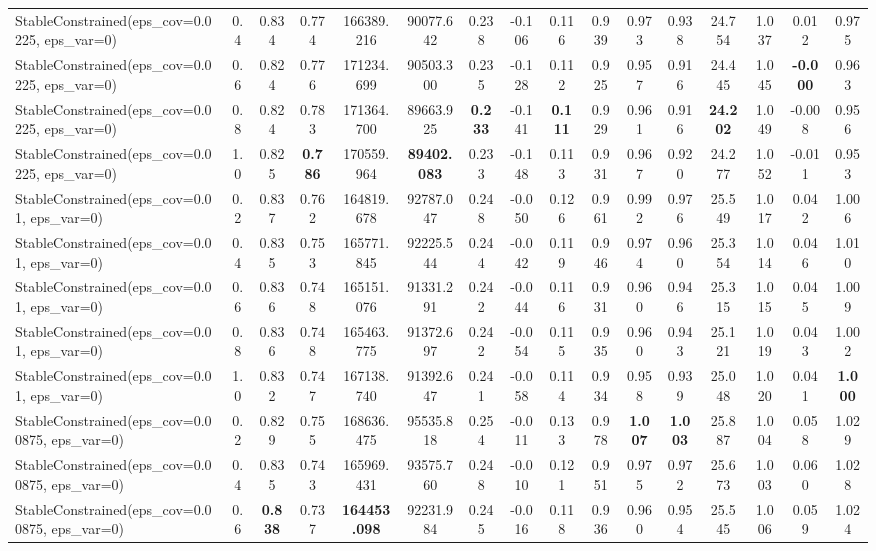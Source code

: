 \documentclass[11pt]{article}
\theoremstyle{plain}
\theoremstyle{definition}
\newcommand{\1}{\mathbf{1}}
\begin{document}
\begin{table}[h]
{\begin{tabular}{lccccccccccccccc}
StableConstrained(eps\_cov=0.0225, eps\_var=0) & 0.4 & 0.834 & 0.774 & 166389.216 & 90077.642 & 0.238 & -0.106 & 0.116 & 0.939 & 0.973 & 0.938 & 24.754 & 1.037 & 0.012 & 0.975 \\
StableConstrained(eps\_cov=0.0225, eps\_var=0) & 0.6 & 0.824 & 0.776 & 171234.699 & 90503.300 & 0.235 & -0.128 & 0.112 & 0.925 & 0.957 & 0.916 & 24.445 & 1.045 & \textbf{-0.000} & 0.963 \\
StableConstrained(eps\_cov=0.0225, eps\_var=0) & 0.8 & 0.824 & 0.783 & 171364.700 & 89663.925 & \textbf{0.233} & -0.141 & \textbf{0.111} & 0.929 & 0.961 & 0.916 & \textbf{24.202} & 1.049 & -0.008 & 0.956 \\
StableConstrained(eps\_cov=0.0225, eps\_var=0) & 1.0 & 0.825 & \textbf{0.786} & 170559.964 & \textbf{89402.083} & 0.233 & -0.148 & 0.113 & 0.931 & 0.967 & 0.920 & 24.277 & 1.052 & -0.011 & 0.953 \\
StableConstrained(eps\_cov=0.01, eps\_var=0) & 0.2 & 0.837 & 0.762 & 164819.678 & 92787.047 & 0.248 & -0.050 & 0.126 & 0.961 & 0.992 & 0.976 & 25.549 & 1.017 & 0.042 & 1.006 \\
StableConstrained(eps\_cov=0.01, eps\_var=0) & 0.4 & 0.835 & 0.753 & 165771.845 & 92225.544 & 0.244 & -0.042 & 0.119 & 0.946 & 0.974 & 0.960 & 25.354 & 1.014 & 0.046 & 1.010 \\
StableConstrained(eps\_cov=0.01, eps\_var=0) & 0.6 & 0.836 & 0.748 & 165151.076 & 91331.291 & 0.242 & -0.044 & 0.116 & 0.931 & 0.960 & 0.946 & 25.315 & 1.015 & 0.045 & 1.009 \\
StableConstrained(eps\_cov=0.01, eps\_var=0) & 0.8 & 0.836 & 0.748 & 165463.775 & 91372.697 & 0.242 & -0.054 & 0.115 & 0.935 & 0.960 & 0.943 & 25.121 & 1.019 & 0.043 & 1.002 \\
StableConstrained(eps\_cov=0.01, eps\_var=0) & 1.0 & 0.832 & 0.747 & 167138.740 & 91392.647 & 0.241 & -0.058 & 0.114 & 0.934 & 0.958 & 0.939 & 25.048 & 1.020 & 0.041 & \textbf{1.000} \\
StableConstrained(eps\_cov=0.00875, eps\_var=0) & 0.2 & 0.829 & 0.755 & 168636.475 & 95535.818 & 0.254 & -0.011 & 0.133 & 0.978 & \textbf{1.007} & \textbf{1.003} & 25.887 & 1.004 & 0.058 & 1.029 \\
StableConstrained(eps\_cov=0.00875, eps\_var=0) & 0.4 & 0.835 & 0.743 & 165969.431 & 93575.760 & 0.248 & -0.010 & 0.121 & 0.951 & 0.975 & 0.972 & 25.673 & 1.003 & 0.060 & 1.028 \\
StableConstrained(eps\_cov=0.00875, eps\_var=0) & 0.6 & \textbf{0.838} & 0.737 & \textbf{164453.098} & 92231.984 & 0.245 & -0.016 & 0.118 & 0.936 & 0.960 & 0.954 & 25.545 & 1.006 & 0.059 & 1.024 \\

\end{tabular}}
\end{table}
\end{document}
